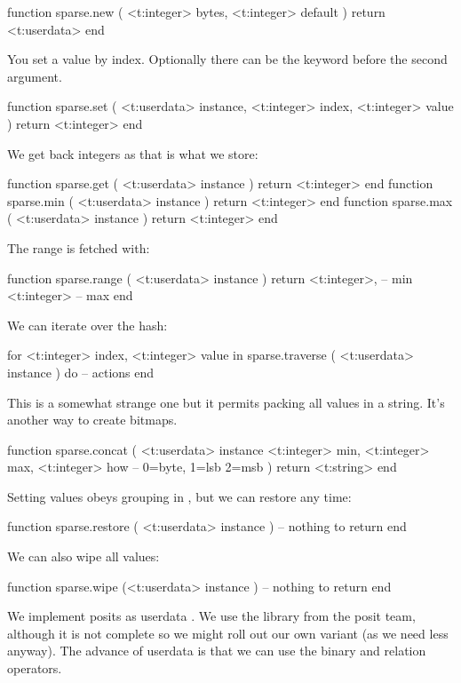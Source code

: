 \starttyping[option=LUA]
function sparse.new (
    <t:integer> bytes,
    <t:integer> default
)
    return <t:userdata>
end
\stoptyping

You set a value by index. Optionally there can be the  keyword
before the second argument.

\starttyping[option=LUA]
function sparse.set (
    <t:userdata> instance,
    <t:integer>  index,
    <t:integer>  value
)
    return <t:integer>
end
\stoptyping

We get back integers as that is what we store:

\starttyping[option=LUA]
function sparse.get ( <t:userdata> instance ) return <t:integer> end
function sparse.min ( <t:userdata> instance ) return <t:integer> end
function sparse.max ( <t:userdata> instance ) return <t:integer> end
\stoptyping

The range is fetched with:

\starttyping[option=LUA]
function sparse.range ( <t:userdata> instance )
    return
        <t:integer>, -- min
        <t:integer>  -- max
end
\stoptyping

We can iterate over the hash:

\starttyping[option=LUA]
for
    <t:integer> index,
    <t:integer> value
in sparse.traverse (
    <t:userdata> instance
) do
    -- actions
end
\stoptyping

This is a somewhat strange one but it permits packing all values in a string.
It's another way to create bitmaps.

\starttyping[option=LUA]
function sparse.concat (
    <t:userdata> instance
    <t:integer>  min,
    <t:integer>  max,
    <t:integer>  how  -- 0=byte, 1=lsb 2=msb
)
    return <t:string>
end
\stoptyping

Setting values obeys grouping in \TEX, but we can restore any time:

\starttyping[option=LUA]
function sparse.restore ( <t:userdata> instance )
    -- nothing to return
end
\stoptyping

We can also wipe all values:

\starttyping[option=LUA]
function sparse.wipe (<t:userdata> instance )
    -- nothing to return
end
\stoptyping

\stopsubsection

\startsubsection[title=Posits]

We implement posits as userdata . We use the library from the posit team,
although it is not complete so we might roll out our own variant (as we need less
anyway). The advance of userdata is that we can use the binary and relation
operators.

